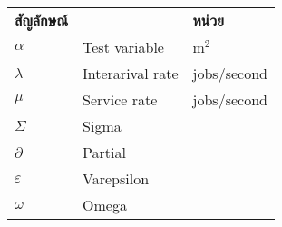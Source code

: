 \begin{flushleft}
\begin{tabular}{@{}p{}p{}p{}}
\textbf{สัญลักษณ์}  & & \textbf{หน่วย} \\[0.2cm]
$\alpha$ & Test variable\hfill & m$^2$ \\
$\lambda$ & Interarival rate\hfill &  jobs/second\\
$\mu$ & Service rate\hfill & jobs/second\\
$ \Sigma $ & Sigma \\
$ \partial $ & Partial \\
$ \varepsilon $ &Varepsilon\\
$ \omega$ & Omega\\
\end{tabular}
\end{flushleft}


